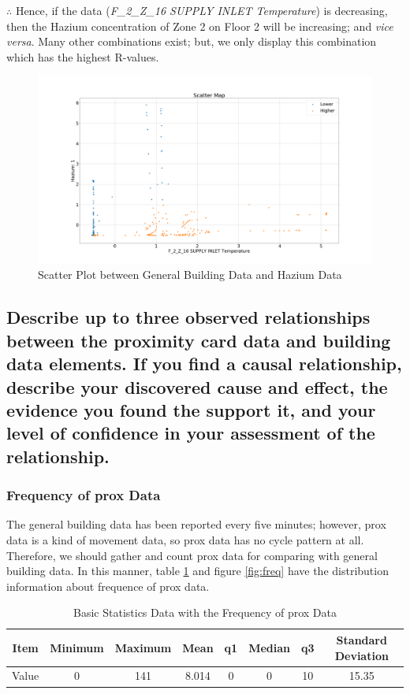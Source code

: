 \documentclass[aps, 10pt, a4paper]{article}
\begin{document}
                $\therefore$ Hence, if the data (\textit{F\_2\_Z\_16 SUPPLY INLET Temperature}) is decreasing, then the Hazium concentration of Zone 2 on Floor 2 will be increasing; and \textit{vice versa}. Many other combinations exist; but, we only display this combination which has the highest R-values.
            
                \begin{figure}[htbp]
                    \centering
                    \includegraphics[width=0.4 \linewidth]{figures/scatter.png}
                    \caption{Scatter Plot between General Building Data and Hazium Data}
                    \label{fig:scatter}
                \end{figure}
        
        \subsection[Question 4]{Describe up to three observed relationships between the proximity card data and building data elements. If you find a causal relationship, describe your discovered cause and effect, the evidence you found the support it, and your level of confidence in your assessment of the relationship.}
            \label{sec:question4}
            \subsubsection{Frequency of prox Data}
                The general building data has been reported every five minutes; however, prox data is a kind of movement data, so prox data has no cycle pattern at all. Therefore, we should gather and count prox data for comparing with general building data. In this manner, table \ref{tb:freq} and figure \ref{fig:freq} have the distribution information about frequence of prox data. 
            
                \begin{table}[htbp]
                    \centering
                    \caption{Basic Statistics Data with the Frequency of prox Data}
                    \label{tb:freq}
                    \begin{tabular}{c||c|c|c|c|c|c|c}
                        Item & Minimum & Maximum & Mean & q1 & Median & q3 & Standard Deviation \\ \hline
                        Value & 0 & 141 & 8.014 & 0 & 0 & 10 & 15.35 \\
                    \end{tabular}
                \end{table}
            
\end{document}
